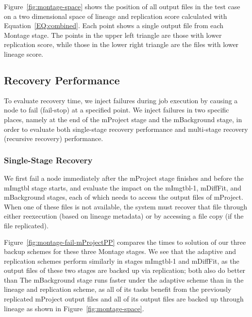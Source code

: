 \documentclass{sig-alternate}
\begin{document}
Figure~\ref{fig:montage-space} shows the position of all output files in the test case on a two dimensional space of lineage and replication score calculated with Equation~\ref{EQ:combined}.
Each point shows a single output file from each Montage stage. The points in the upper left triangle are those with lower
replication score, while those in the lower right triangle are the files with lower lineage score.


\subsection{Recovery Performance}
To evaluate recovery time, we inject failures during job execution by causing a node to fail (fail-stop) at a specified point.
We inject failures in two specific places, namely at the end of the mProject stage and the mBackground stage,
in order to evaluate both single-stage recovery performance and multi-stage recovery (recursive recovery) performance.

\subsubsection{Single-Stage Recovery}
We first fail a node immediately after the mProject stage finishes and before the mImgtbl stage starts,
and evaluate the impact on the mImgtbl-1, mDiffFit, and mBackground stages, each of which
needs to access the output files of mProject.
When one of these files is not available, the system must recover that file through either reexecution (based on
lineage metadata) or by accessing a file copy (if the file replicated).

Figure~\ref{fig:montage-fail-mProjectPP} compares the times to solution of our three backup schemes for these three
Montage stages.
We see that the adaptive and replication schemes perform similarly in stages mImgtbl-1 and mDiffFit,
as the output files of these two stages are backed up via replication; both also do better than
The mBackground stage runs faster under the adaptive scheme than in the lineage and replication scheme,
as all of its tasks benefit from the previously replicated mProject output files and all of its output files are backed up through lineage as shown in Figure~\ref{fig:montage-space}.
\end{document}
